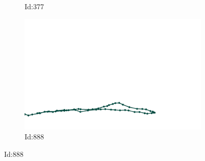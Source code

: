 \documentclass[12pt,twoside]{report}
\begin{document}
\begin{figure}
\begin{subfigure}[b]{0.20\textwidth}
\caption{Id:377}
\end{subfigure}
\begin{subfigure}[b]{0.20\textwidth}
\centering
\includegraphics[width=\textwidth]{../../trajectories/888.png}
\caption{Id:888}
\end{subfigure}
\end{figure}
\end{document}
